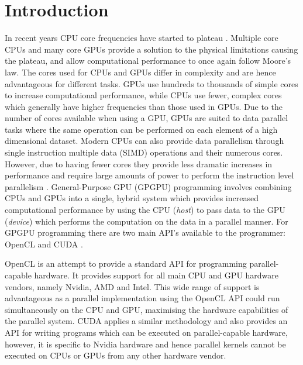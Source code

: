 \documentclass{sig-alternate-05-2015}
\begin{document}
%
%

%
%
\printccsdesc



\section{Introduction}\label{sec:intro}

In recent years CPU core frequencies have started to plateau 
\cite{standb}. Multiple core CPUs and many core GPUs provide a solution to the physical
limitations causing the plateau, and allow computational performance to once
again follow Moore's law. The cores used for CPUs and GPUs differ 
in complexity and are hence advantageous for different tasks. GPUs use hundreds
to thousands of simple cores to increase computational performance, while CPUs 
use fewer, complex cores which generally have higher frequencies than those used
in GPUs. Due to the number of cores available when using a GPU, GPUs are suited 
to data parallel tasks where the same operation can be performed on each element 
of a high dimensional dataset. Modern CPUs can also provide data parallelism through
single instruction multiple data (SIMD) operations and their numerous cores. However, 
due to having fewer cores they provide less dramatic increases in performance and require 
large amounts of power to perform the instruction level parallelism \cite{kumar:power}.
General-Purpose GPU (GPGPU) programming involves combining CPUs and GPUs 
into a single, hybrid system which provides increased computational performance 
by using the CPU (\textit{host}) to pass data to the GPU (\textit{device}) which 
performs the computation on the data in a parallel manner.
For GPGPU programming there are two main API's available to the programmer: 
OpenCL \cite{opencl} and CUDA \cite{cuda}. 

OpenCL is an attempt to provide a standard API for programming parallel-capable
hardware. It provides support for all main CPU and GPU hardware vendors, namely
Nvidia, AMD and Intel. This wide range of support is advantageous as a 
parallel implementation using the OpenCL API could run simultaneously on the CPU
and GPU, maximising the hardware capabilities of the parallel system. \mbox{CUDA} applies 
a similar methodology and also provides an API for writing programs which can be 
executed on parallel-capable hardware, however, it is specific to Nvidia hardware 
and hence parallel kernels cannot be executed on CPUs or GPUs from any other 
hardware vendor.
\end{document}
